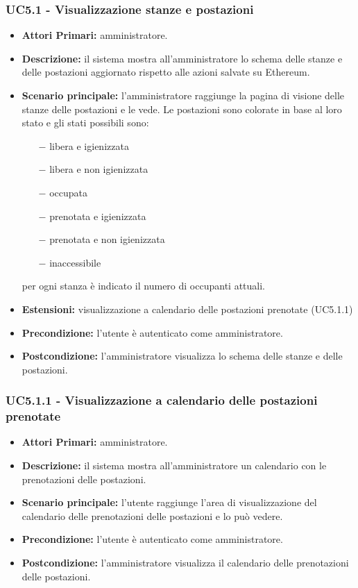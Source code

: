 \subsubsection{ UC5.1 - Visualizzazione stanze e postazioni}
\begin{itemize}
	\item\textbf{Attori Primari:}
	amministratore.
	\item\textbf{Descrizione:}
	il sistema mostra all'amministratore lo schema delle stanze e delle postazioni aggiornato rispetto alle azioni salvate su Ethereum.
	\item\textbf{Scenario principale:}
	l'amministratore raggiunge la pagina di visione delle stanze delle postazioni e le vede. Le postazioni sono colorate in base al loro stato e gli stati possibili sono:
	\begin{itemize}
		\item[$-$] libera e igienizzata
		\item[$-$] libera e non igienizzata
		\item[$-$] occupata
		\item[$-$] prenotata e igienizzata
		\item[$-$] prenotata e non igienizzata
		\item[$-$] inaccessibile
	\end{itemize}
	per ogni stanza è indicato il numero di occupanti attuali.
	\item\textbf{Estensioni:}
	visualizzazione a calendario delle postazioni prenotate (UC5.1.1)
	\item\textbf{Precondizione:} 
	l'utente è autenticato come amministratore.
	\item\textbf{Postcondizione:}
	l'amministratore visualizza lo schema delle stanze e delle postazioni.
\end{itemize}

\subsubsection{ UC5.1.1 - Visualizzazione a calendario delle postazioni prenotate}
\begin{itemize}
	\item\textbf{Attori Primari:}
	amministratore.
	\item\textbf{Descrizione:}
	il sistema mostra all'amministratore un calendario con le prenotazioni delle postazioni.
	\item\textbf{Scenario principale:}
	l'utente raggiunge l'area di visualizzazione del calendario delle prenotazioni delle postazioni e lo può vedere.
	\item\textbf{Precondizione:} 
	l'utente è autenticato come amministratore.
	\item\textbf{Postcondizione:}
	l'amministratore visualizza il calendario delle prenotazioni delle postazioni.
\end{itemize}

